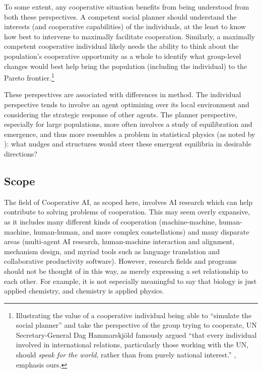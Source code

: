 \documentclass[11pt, a4paper, logo, onecolumn, nonumbering]{deepmind}
\begin{document}
To some extent, any cooperative situation benefits from being understood from both these perspectives. A competent social planner should understand the interests (and cooperative capabilities) of the individuals, at the least to know how best to intervene to maximally facilitate cooperation. Similarly, a maximally competent cooperative individual likely needs the ability to think about the population's cooperative opportunity as a whole to identify what group-level changes would best help bring the population (including the individual) to the Pareto frontier.\footnote{Illustrating the value of a cooperative individual being able to ``simulate the social planner'' and take the perspective of the group trying to cooperate, UN Secretary-General Dag Hammarskj\"old famously argued ``that every individual involved in international relations, particularly those working with the UN, should \emph{speak for the world}, rather than from purely national interest.'' \cite{gaudiosi2019negotiating}, emphasis ours.}

These perspectives are associated with differences in method. The individual perspective tends to involve an agent optimizing over its local environment and considering the strategic response of other agents. The planner perspective, especially for large populations, more often involves a study of equilibration and emergence, and thus more resembles a problem in statistical physics (as noted by \cite{kraus1997negotiation}): what nudges and structures would steer these emergent equilibria in desirable directions?


\subsection{Scope}
\label{section:scope}


The field of Cooperative AI, as scoped here, involves AI research which can help contribute to solving problems of cooperation. This may seem overly expansive, as it includes many different kinds of cooperation (machine-machine, human-machine, human-human, and more complex constellations) and many disparate areas (multi-agent AI research, human-machine interaction and alignment, mechanism design, and myriad tools such as language translation and collaborative productivity software). However, research fields and programs should not be thought of in this way, as merely expressing a set relationship to each other. For example, it is not especially meaningful to say that biology is just applied chemistry, and chemistry is applied physics.
\end{document}
